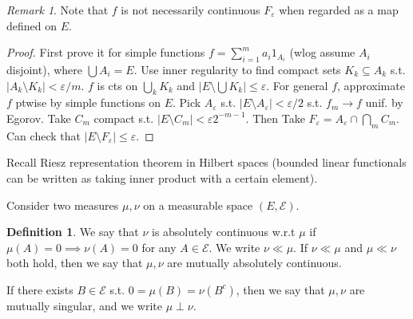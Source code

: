 \documentclass{article}
\theoremstyle{definition}
\newtheorem{defn}{Definition}[section]
\theoremstyle{remark}
\newtheorem{rem}{Remark}
\theoremstyle{plain}
\begin{document}
\begin{rem}
    Note that $f$ is not necessarily continuous $F_\varepsilon$ when regarded as a map defined on $E$.
\end{rem}
\begin{proof}
    First prove it for simple functions $f=\sum_{i=1}^ma_i1_{A_i}$ (wlog assume $A_i$ disjoint), where $\bigcup A_i=E$. Use inner regularity to find compact sets $K_k\subseteq A_k$ s.t. $|A_k\setminus K_k|<\varepsilon/m$. $f$ is cts on $\bigcup_k K_k$ and $|E\setminus\bigcup K_k|\le\varepsilon$. For general $f$, approximate $f$ ptwise by simple functions on $E$. Pick $A_\varepsilon$ s.t. $|E\setminus A_\varepsilon|<\varepsilon/2$ s.t. $f_m\to f$ unif. by Egorov. Take $C_m$ compact s.t. $|E\setminus C_m|<\varepsilon 2^{-m-1}$. Then Take $F_\varepsilon=A_\varepsilon\cap\bigcap_mC_m$. Can check that $|E\setminus F_\varepsilon|\le\varepsilon$.
\end{proof}
Recall Riesz representation theorem in Hilbert spaces (bounded linear functionals can be written as taking inner product with a certain element).

Consider two measures $\mu,\nu$ on a measurable space $(E,\mathcal E)$. 
\begin{defn}
    We say that $\nu$ is absolutely continuous w.r.t $\mu$ if $\mu(A)=0\implies\nu(A)=0$ for any $A\in\mathcal E$. We write $\nu\ll\mu$. If $\nu\ll\mu$ and $\mu\ll\nu$ both hold, then we say that $\mu,\nu$ are mutually absolutely continuous.

    If there exists $B\in\mathcal E$ s.t. $0=\mu(B)=\nu(B^c)$, then we say that $\mu,\nu$ are mutually singular, and we write $\mu\perp\nu$.
\end{defn}
\end{document}
